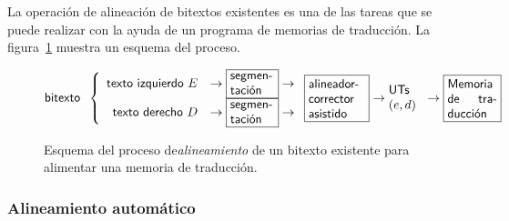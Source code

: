 La operación de alineación de bitextos existentes es una de las tareas que se puede realizar con la ayuda de un programa de memorias de traducción. La figura~\ref{fg:aliMT} muestra un esquema del proceso. \begin{figure} {\small $$ \mbox{\textsf{bitexto}}\;\;\left\{\begin{array}{rcl} \mbox{\textsf{texto izquierdo $E$}} &\to \mbox{\framebox{\parbox{1.25cm}{\textsf{segmen- tación}}}} \to \\ \mbox{\textsf{texto derecho $D$}} &\to \mbox{\framebox{\parbox{1.25cm}{\textsf{segmen- tación}}}} \to \\ \end{array} \right. \mbox{\framebox{\parbox{1.6cm}{\textsf{alineador-corrector asistido}}}} \to \mbox{\parbox{1cm}{\textsf{UTs} $(e,d)$}} \to \mbox{\framebox{\parbox{1.4cm}{\textsf{Memoria de traducción}}}} $$ } \caption{Esquema del proceso de\emph{alineamiento} de un bitexto existente para alimentar una memoria de traducción.} \label{fg:aliMT} \end{figure} 

\subsubsection{Alineamiento automático} 

